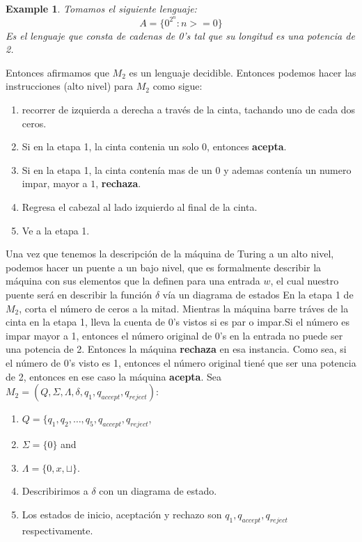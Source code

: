 \documentclass[10pt]{report}
\newtheorem{example}{Example}
\begin{document}
    \begin{example}
        Tomamos el siguiente lenguaje:
        \begin{equation}
            A = \{ 0^2^n : n>=0\}\label{eq:equation2}
        \end{equation}
        Es el lenguaje que consta de cadenas de 0's tal que su longitud es una
        potencia de 2.
    \end{example}
    Entonces afirmamos que $M_{2}$ es un lenguaje decidible.
    Entonces podemos hacer las instrucciones (alto  nivel) para $M_{2}$ como sigue:
    \begin{enumerate}
        \item recorrer de izquierda a derecha a través de la cinta, tachando uno de cada dos ceros.
        \item Si en la etapa 1, la cinta contenia un solo $0$, entonces \textbf{acepta}.
        \item Si en la etapa 1, la cinta contenía mas de un $0$ y ademas contenía un numero impar, mayor a $1$, \textbf{rechaza}.
        \item Regresa el cabezal al lado izquierdo      al final de la cinta.
        \item Ve a la etapa 1.
    \end{enumerate}
    Una vez que tenemos la descripción de la máquina de Turing a un alto nivel, podemos hacer un puente
    a un bajo nivel, que es formalmente describir la máquina con sus elementos que la definen para una entrada $w$,
    el cual nuestro puente será en describir la función $\delta$ vía un diagrama de estados
    En la etapa 1 de $M_{2}$, corta el número de ceros a la mitad. Mientras la máquina barre tráves de la cinta en la
    etapa 1, lleva la cuenta de $0$'s vistos si es par o impar.\newline Si el número es impar mayor a 1, entonces el número original
    de $0$'s en la entrada no puede ser una potencia de 2. Entonces la máquina \textbf{rechaza} en esa instancia.
    Como sea, si el número de 0's visto es 1, entonces el número original tiené que ser una potencia de 2, entonces en ese
    caso la máquina \textbf{acepta}.
    Sea $M_{2} =(Q,\Sigma,\Lambda,\delta,q_{1},q_{accept},q_{reject})$:
    \begin{enumerate}
        \item $Q = \{q_{1},q_{2},\dots,q_{5},q_{accept},q_{reject}$,
        \item $\Sigma = \{ 0 \}$ and
        \item $\Lambda = \{0,x,\sqcup \}$.
        \item Describirimos a $\delta$ con un diagrama de estado.
        \item Los estados de inicio, aceptación y rechazo son $q_{1},q_{accept},q_{reject}$ respectivamente.
    \end{enumerate}
    \newline
\end{document}
